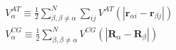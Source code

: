 \documentclass[12pt]{article}
\begin{document}
\begin{eqnarray}\label{hadress_V}
&& V^{AT}_\alpha \equiv \displaystyle\frac{1}{2}\sum_{\beta,\beta\neq \alpha}^{N} \sum_{ij} V^{AT}(|\textbf{r}_{\alpha i} - \textbf{r}_{\beta j}|)\\ \nonumber
&& V^{CG}_\alpha \equiv \displaystyle\frac{1}{2}\sum_{\beta,\beta\neq \alpha}^{N} V^{CG}(|\textbf{R}_\alpha - \textbf{R}_\beta|)
\end{eqnarray}
\end{document}
